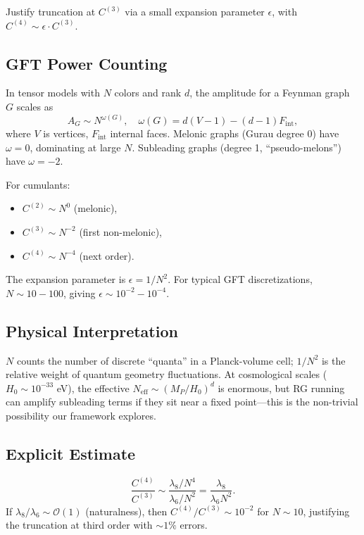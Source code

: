 \documentclass[12pt,a4paper]{article}
\begin{document}
Justify truncation at \(C^{(3)}\) via a small expansion parameter \(\epsilon\), with \(C^{(4)} \sim \epsilon \cdot C^{(3)}\).

\subsection{GFT Power Counting}

In tensor models with \(N\) colors and rank \(d\), the amplitude for a Feynman graph \(G\) scales as
\begin{equation}
A_G \sim N^{\omega(G)}, \quad \omega(G) = d(V-1) - (d-1)F_{\text{int}},
\end{equation}
where \(V\) is vertices, \(F_{\text{int}}\) internal faces. Melonic graphs (Gurau degree 0) have \(\omega = 0\), dominating at large \(N\). Subleading graphs (degree 1, ``pseudo-melons'') have \(\omega = -2\).

For cumulants:
\begin{itemize}
\item \(C^{(2)} \sim N^0\) (melonic),
\item \(C^{(3)} \sim N^{-2}\) (first non-melonic),
\item \(C^{(4)} \sim N^{-4}\) (next order).
\end{itemize}

The expansion parameter is \(\epsilon = 1/N^2\). For typical GFT discretizations, \(N \sim 10-100\), giving \(\epsilon \sim 10^{-2}-10^{-4}\).

\subsection{Physical Interpretation}

\(N\) counts the number of discrete ``quanta'' in a Planck-volume cell; \(1/N^2\) is the relative weight of quantum geometry fluctuations. At cosmological scales (\(H_0 \sim 10^{-33}\) eV), the effective \(N_{\text{eff}} \sim (M_P/H_0)^d\) is enormous, but RG running can amplify subleading terms if they sit near a fixed point—this is the non-trivial possibility our framework explores.

\subsection{Explicit Estimate}

\begin{equation}
\frac{C^{(4)}}{C^{(3)}} \sim \frac{\lambda_8/N^4}{\lambda_6/N^2} = \frac{\lambda_8}{\lambda_6 N^2}.
\end{equation}
If \(\lambda_8/\lambda_6 \sim \mathcal{O}(1)\) (naturalness), then \(C^{(4)}/C^{(3)} \sim 10^{-2}\) for \(N \sim 10\), justifying the truncation at third order with \(\sim 1\%\) errors.
\end{document}
